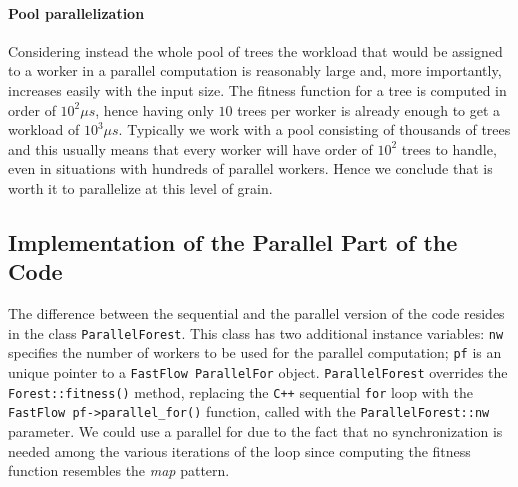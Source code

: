 \documentclass[10pt]{article}
\numberwithin{equation}{section}
\begin{document}
\paragraph{Pool parallelization}
Considering instead the whole pool of trees the workload that would be assigned to a worker in a parallel computation is reasonably large and, more importantly, increases easily with the input size. The fitness function for a tree is computed in order of $10^{2}\mu$$s$, hence having only $10$ trees per worker is already enough to get a workload of $10^{3}\mu$$s$. Typically we work with a pool consisting of thousands of trees and this usually means that every worker will have order of $10^{2}$ trees to handle, even in situations with hundreds of parallel workers. Hence we conclude that is worth it to parallelize at this level of grain.

\subsection{Implementation of the Parallel Part of the Code}
The difference between the sequential and the parallel version of the code resides in the class \verb|ParallelForest|. This class has two additional instance variables: \verb|nw| specifies the number of workers to be used for the parallel computation; \verb|pf| is an unique pointer to a \verb|FastFlow ParallelFor| object. \verb|ParallelForest| overrides the \verb|Forest::fitness()| method, replacing the \verb|C++| sequential \verb|for| loop with the \verb|FastFlow pf->parallel_for()| function, called with the \verb|ParallelForest::nw| parameter. We could use a parallel for due to the fact that no synchronization is needed among the various iterations of the loop since computing the fitness function resembles the \emph{map} pattern.
\end{document}
